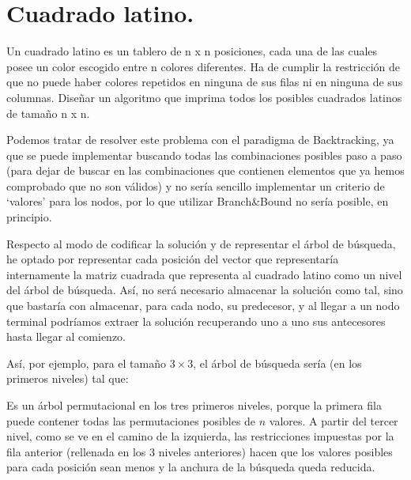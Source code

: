 \documentclass[a4paper, 11pt]{article}
\begin{document}
\section{Cuadrado latino.}	
Un cuadrado latino es un tablero de n x n posiciones, cada una de las cuales posee un
color escogido entre n colores diferentes. Ha de cumplir la restricción de que no puede haber
colores repetidos en ninguna de sus filas ni en ninguna de sus columnas. Diseñar un algoritmo que imprima todos los posibles cuadrados latinos de tamaño n x n.

Podemos tratar de resolver este problema con el paradigma de Backtracking, ya que se puede implementar buscando todas las combinaciones posibles paso a paso (para dejar de buscar en las combinaciones que contienen elementos que ya hemos comprobado que no son válidos) y no sería sencillo implementar un criterio de `valores' para los nodos, por lo que utilizar Branch\&Bound no sería posible, en principio.

Respecto al modo de codificar la solución y de representar el árbol de búsqueda, he optado por representar cada posición del vector que representaría internamente la matriz cuadrada que representa al cuadrado latino como un nivel del árbol de búsqueda. Así, no será necesario almacenar la solución como tal, sino que bastaría con almacenar, para cada nodo, su predecesor, y al llegar a un nodo terminal podríamos extraer la solución recuperando uno a uno sus antecesores hasta llegar al comienzo.

Así, por ejemplo, para el tamaño $3\times 3$, el árbol de búsqueda sería (en los primeros niveles) tal que:


Es un árbol permutacional en los tres primeros niveles, porque la primera fila puede contener todas las permutaciones posibles de $n$ valores.
A partir del  tercer nivel, como se ve en el camino de la izquierda, las restricciones impuestas por la fila anterior (rellenada en los 3 niveles anteriores) hacen que los valores posibles para cada posición sean menos y la anchura de la búsqueda queda reducida.
\end{document}
